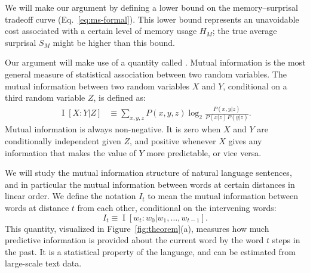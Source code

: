 We will make our argument by defining a lower bound on the memory--surprisal tradeoff curve (Eq.~\ref{eq:ms-formal}). This lower bound represents an unavoidable cost associated with a certain level of memory usage $H_M$; the true average surprisal $S_M$ might be higher than this bound. 

Our argument will make use of a quantity called . Mutual information is the most general measure of statistical association between two random variables. The mutual information between two random variables $X$ and $Y$, conditional on a third random variable $Z$, is defined as:
\begin{align}
\label{eq:mi}
    \operatorname{I}[X:Y|Z] &\equiv \sum_{x,y,z} P(x,y,z) \log_2 \frac{P(x,y|z)}{P(x|z)P(y|z)}. %
\end{align}
Mutual information is always non-negative. It is zero when $X$ and $Y$ are conditionally independent given $Z$, and positive whenever $X$ gives any information that makes the value of $Y$ more predictable, or vice versa. 

We will study the mutual information structure of natural language sentences, and in particular the mutual information between words at certain distances in linear order. We define the notation $I_t$ to mean the mutual information between words at distance $t$ from each other, conditional on the intervening words:
\begin{equation*}
    I_t \equiv \operatorname{I}[w_t : w_0 | w_1, \dots, w_{t-1}].
\end{equation*}
This quantity, visualized in Figure~\ref{fig:theorem}(a), measures how much predictive information is provided about the current word by the word $t$ steps in the past.
It is a statistical property of the language, and can be estimated from large-scale text data.

